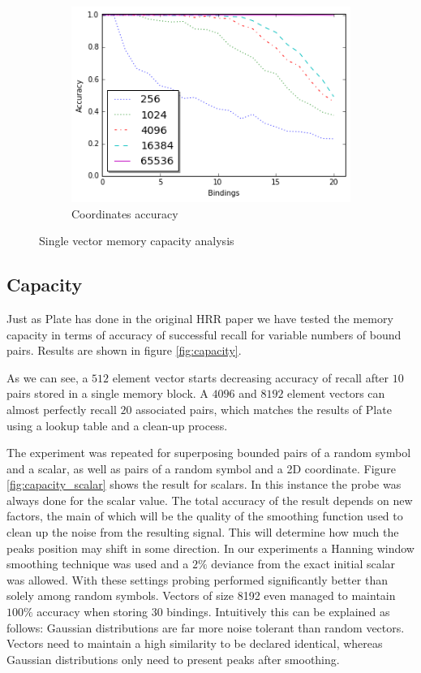 \documentclass[a4paper,twoside]{article}
\begin{document}
\begin{figure}[th!]
\begin{subfigure}{0.45\columnwidth}
				\includegraphics[width=1\columnwidth]{img/capacity_coordinate.png}
				\caption{Coordinates accuracy}
				\label{fig:capacity_coordinate}
			\end{subfigure}	
			\caption{Single vector memory capacity analysis}
		\end{figure}	
	
	
	\subsection{Capacity}
	
	Just as Plate has done in the original HRR paper \cite{Plate:1995:HolographicReducedRepresentations} we have tested the memory capacity in terms of accuracy of successful recall for variable numbers of bound pairs. Results are shown in figure \ref{fig:capacity}.
	
	As we can see, a $512$ element vector starts decreasing accuracy of recall after $10$ pairs stored in a single memory block. A $4096$ and $8192$ element vectors can almost perfectly recall $20$ associated pairs, which matches the results of Plate using a lookup table and a clean-up process. 
	
	The experiment was repeated for superposing bounded pairs of a random symbol and a scalar, as well as pairs of a random symbol and a 2D coordinate. Figure \ref{fig:capacity_scalar} shows the result for scalars. In this instance the probe was always done for the scalar value. The total accuracy of the result depends on new factors, the main of which will be the quality of the smoothing function used to clean up the noise from the resulting signal. This will determine how much the peaks position may shift in some direction. In our experiments a Hanning window smoothing technique was used and a $2\%$ deviance from the exact initial scalar was allowed. With these settings probing performed significantly better than solely among random symbols. Vectors of size 8192 even managed to maintain $100\%$ accuracy when storing $30$ bindings. Intuitively this can be explained as follows: Gaussian distributions are far more noise tolerant than random vectors. Vectors need to maintain a high similarity to be declared identical, whereas Gaussian distributions only need to present peaks after smoothing. 
	
\end{document}
